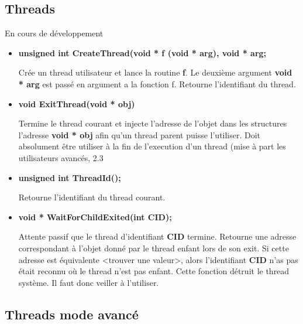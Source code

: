 \documentclass{article}
\begin{document}
\subsection{Threads}
En cours de développement
\begin{itemize}

    \item 
    \textbf{unsigned int CreateThread(void * f (void * arg), void * arg;}
    
    Crée un thread utilisateur et lance la routine \textbf{f}. Le deuxième argument 
    \textbf{void * arg} est passé en argument a la fonction f.
    Retourne l'identifiant du thread.
   
   \item 
   \textbf{void ExitThread(void * obj)} 
   
   Termine le thread courant et injecte l'adresse de l'objet dans les structures l'adresse \textbf{void * obj} afin qu'un thread parent puisse l'utiliser. Doit absolument être utiliser à la fin de l'execution d'un thread (mise à part les utilisateurs avancés, 2.3
   
   \item 
   \textbf{unsigned int ThreadId();}
   
  Retourne l'identifiant du thread courant.   
   
   \item
   \textbf{void * WaitForChildExited(int CID);} 
   
   Attente passif que le thread d'identifiant \textbf{CID} termine. Retourne une adresse correspondant à l'objet donné par le thread enfant lors de son exit. Si cette adresse est équivalente <trouver une valeur>, alors l'identifiant \textbf{CID} n'as pas était reconnu où le thread n'est pas enfant.
   Cette fonction détruit le thread système. Il faut donc veiller à l'utiliser.
   
    
\end{itemize}

\subsection{Threads mode avancé}
\end{document}
